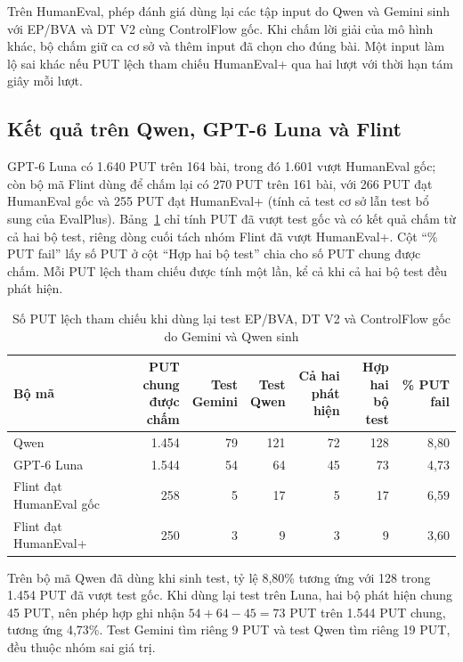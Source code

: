 Trên HumanEval, phép đánh giá dùng lại các tập input do Qwen và Gemini sinh với EP/BVA và DT V2 cùng ControlFlow gốc. Khi chấm lời giải của mô hình khác, bộ chấm giữ ca cơ sở và thêm input đã chọn cho đúng bài. Một input làm lộ sai khác nếu PUT lệch tham chiếu HumanEval+ qua hai lượt với thời hạn tám giây mỗi lượt.

\subsection{Kết quả trên Qwen, GPT-6 Luna và Flint}

GPT-6 Luna có 1.640 PUT trên 164 bài, trong đó 1.601 vượt HumanEval gốc; còn bộ mã Flint dùng để chấm lại có 270 PUT trên 161 bài, với 266 PUT đạt HumanEval gốc và 255 PUT đạt HumanEval+ (tính cả test cơ sở lẫn test bổ sung của EvalPlus). Bảng~\ref{tab:cross-model-he} chỉ tính PUT đã vượt test gốc và có kết quả chấm từ cả hai bộ test, riêng dòng cuối tách nhóm Flint đã vượt HumanEval+.
Cột ``\% PUT fail'' lấy số PUT ở cột ``Hợp hai bộ test'' chia cho số PUT chung được chấm. Mỗi PUT lệch tham chiếu được tính một lần, kể cả khi cả hai bộ test đều phát hiện.

\begin{table}[!htbp]
\centering
\caption[Số PUT lệch tham chiếu khi dùng lại test V2 và ControlFlow gốc]{Số PUT lệch tham chiếu khi dùng lại test EP/BVA, DT V2 và ControlFlow gốc do Gemini và Qwen sinh}
\label{tab:cross-model-he}
\small
\begin{tabular*}{\linewidth}{@{\extracolsep{\fill}}lrrrrrr@{}}
\toprule
Bộ mã & \shortstack[r]{PUT chung\\được chấm} & \shortstack[r]{Test\\Gemini} & \shortstack[r]{Test\\Qwen} & \shortstack[r]{Cả hai\\phát hiện} & \shortstack[r]{Hợp hai\\bộ test} & \% PUT fail \\
\midrule
Qwen & 1.454 & 79 & 121 & 72 & 128 & 8,80 \\
GPT-6 Luna & 1.544 & 54 & 64 & 45 & 73 & 4,73 \\
Flint đạt HumanEval gốc & 258 & 5 & 17 & 5 & 17 & 6,59 \\
Flint đạt HumanEval+ & 250 & 3 & 9 & 3 & 9 & 3,60 \\
\bottomrule
\end{tabular*}
\end{table}

Trên bộ mã Qwen đã dùng khi sinh test, tỷ lệ 8,80\% tương ứng với 128 trong 1.454 PUT đã vượt test gốc. Khi dùng lại test trên Luna, hai bộ phát hiện chung 45 PUT, nên phép hợp ghi nhận \(54+64-45=73\) PUT trên 1.544 PUT chung, tương ứng 4,73\%. Test Gemini tìm riêng 9 PUT và test Qwen tìm riêng 19 PUT, đều thuộc nhóm sai giá trị.

